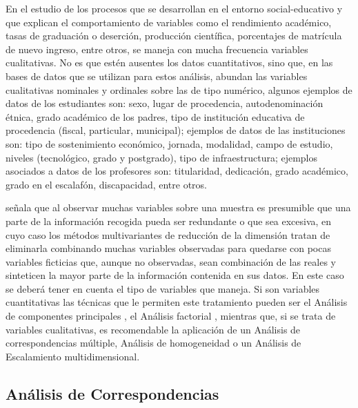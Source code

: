 \documentclass[water,article,submit,moreauthors,pdftex]{mdpi}
\begin{document}
En el estudio de los procesos que se desarrollan en el entorno
social-educativo y que explican el comportamiento de variables como el
rendimiento académico, tasas de graduación o deserción, producción
científica, porcentajes de matrícula de nuevo ingreso, entre otros, se
maneja con mucha frecuencia variables cualitativas. No es que estén
ausentes los datos cuantitativos, sino que, en las bases de datos que se
utilizan para estos análisis, abundan las variables cualitativas
nominales y ordinales sobre las de tipo numérico, algunos ejemplos de
datos de los estudiantes son: sexo, lugar de procedencia,
autodenominación étnica, grado académico de los padres, tipo de
institución educativa de procedencia (fiscal, particular, municipal);
ejemplos de datos de las instituciones son: tipo de sostenimiento
económico, jornada, modalidad, campo de estudio, niveles (tecnológico,
grado y postgrado), tipo de infraestructura; ejemplos asociados a datos
de los profesores son: titularidad, dedicación, grado académico, grado
en el escalafón, discapacidad, entre otros.

\citet{perez2004} señala que al observar muchas variables sobre una
muestra es presumible que una parte de la información recogida pueda ser
redundante o que sea excesiva, en cuyo caso los métodos multivariantes
de reducción de la dimensión tratan de eliminarla combinando muchas
variables observadas para quedarse con pocas variables ficticias que,
aunque no observadas, sean combinación de las reales y sinteticen la
mayor parte de la información contenida en sus datos. En este caso se
deberá tener en cuenta el tipo de variables que maneja. Si son variables
cuantitativas las técnicas que le permiten este tratamiento pueden ser
el Análisis de componentes principales
\citep{Person1901, Hotelling1933}, el Análisis factorial
\citep{ch1904, thurstone1947, kaiser1958}, mientras que, si se trata de
variables cualitativas, es recomendable la aplicación de un Análisis de
correspondencias múltiple, Análisis de homogeneidad o un Análisis de
Escalamiento multidimensional.

\hypertarget{anuxe1lisis-de-correspondencias}{%
\subsection{Análisis de
Correspondencias}\label{anuxe1lisis-de-correspondencias}}
\end{document}
